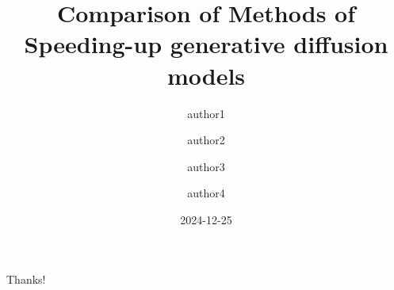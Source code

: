 \documentclass{beamer}
\author{author1 \and author2 \and author3 \and author4}
\title{Comparison of Methods of Speeding-up generative diffusion models}
\date{2024-12-25}
\begin{document}
\maketitle
\tableofcontents



\begin{frame}
    \begin{center}
        {\Huge\calligra Thanks!}
    \end{center}
\end{frame}
\end{document}
